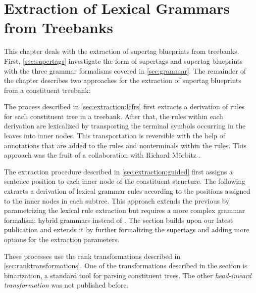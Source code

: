 \documentclass[../document.tex]{subfiles}
\begin{document}
    \chapter{Extraction of Lexical Grammars from Treebanks}\label{sec:extraction}
    This chapter deals with the extraction of supertag blueprints from treebanks.
    First, \cref{sec:supertags} investigate the form of supertags and supertag blueprints with the three grammar formalisms covered in \cref{sec:grammar}.
    The remainder of the chapter describes two approaches for the extraction of supertag blueprints from a constituent treebank:
    \begin{compactenum}
        \item
            The process described in \cref{sec:extraction:lcfrs} first extracts a derivation of  rules for each constituent tree in a treebank.
            After that, the rules within each derivation are lexicalized by transporting the terminal symbols occurring in the leaves into inner nodes.
            This transportation is reversible with the help of annotations that are added to the rules and nonterminals within the rules.
            This approach was the fruit of a collaboration with Richard Mörbitz \citep{MoeRup20,RupMoe21}.
        \item
            The extraction procedure described in \cref{sec:extraction:guided} first assigns a sentence position to each inner node of the constituent structure.
            The following extracts a derivation of lexical grammar rules according to the positions assigned to the inner nodes in each subtree.
            This approach extends the previous by parametrizing the lexical rule extraction but requires a more complex grammar formalism: hybrid grammars instead of .
            The section builds upon our latest publication \citep{Rup22} and extends it by further formalizing the supertags and adding more options for the extraction parameters.
    \end{compactenum}
    These processes use the rank transformations described in \cref{sec:ranktransformations}.
    One of the transformations described in the section is binarization, a standard tool for parsing constituent trees.
    The other \emph{head-inward transformation} was not published before.

    
    
    
    

\end{document}
